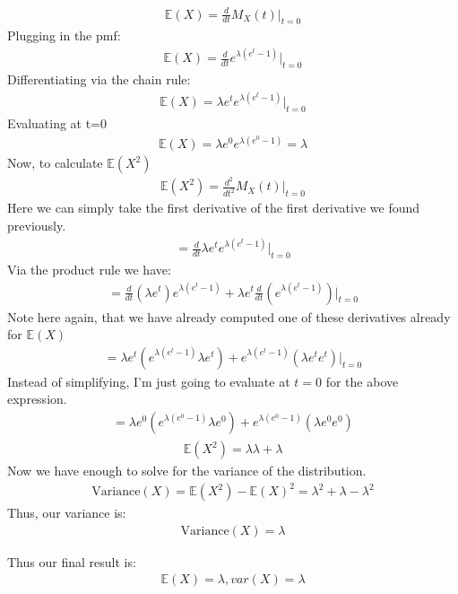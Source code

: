 \documentclass{article}
\begin{document}
\begin{align*}
\mathbb{E}(X)=\frac{d}{dt}M_X(t) |_{t=0}
\end{align*}
Plugging in the pmf:
\begin{align*}
\mathbb{E}(X)=\frac{d}{dt}e^{\lambda(e^t-1)} |_{t=0}
\end{align*}
Differentiating via the chain rule:
\begin{align*}
\mathbb{E}(X)=\lambda e^t e^{\lambda(e^t-1)} |_{t=0}
\end{align*}
Evaluating at t=0
\begin{align*}
\mathbb{E}(X)=\lambda e^0 e^{\lambda(e^0-1)} = \lambda
\end{align*}
Now, to calculate $\mathbb{E}(X^2)$
\begin{align*}
\mathbb{E}(X^2)=\frac{d^2}{dt^2}M_X(t) |_{t=0}
\end{align*}
Here we can simply take the first derivative of the first derivative we found previously.
\begin{align*}
=\frac{d}{dt}\lambda e^t e^{\lambda(e^t-1)} |_{t=0}
\end{align*}
Via the product rule we have:
\begin{align*}
= \frac{d}{dt}(\lambda e^t) e^{\lambda(e^t-1)} + \lambda e^t \frac{d}{dt}(e^{\lambda(e^t-1)}) |_{t=0}
\end{align*}
Note here again, that we have already computed one of these derivatives already for $\mathbb{E}(X)$
\begin{align*}
= \lambda e^t (e^{\lambda(e^t-1)} \lambda e^t) + e^{\lambda(e^t-1)} (\lambda e^t e^t) |_{t=0}
\end{align*}
Instead of simplifying, I'm just going to evaluate at $t=0$ for the above expression.
\begin{align*}
= \lambda e^0 (e^{\lambda(e^0-1)} \lambda e^0) + e^{\lambda(e^0-1)} (\lambda e^0 e^0)
\end{align*}
\begin{align*}
\boxed{\mathbb{E}(X^2)= \lambda \lambda + \lambda }
\end{align*}
Now we have enough to solve for the variance of the distribution.
\begin{align*}
\text{Variance}(X) = \mathbb{E}(X^2)-\mathbb{E}(X)^2 = \lambda^2 + \lambda - \lambda^2
\end{align*}
Thus, our variance is:
\begin{align*}
\text{Variance}(X) = \lambda
\end{align*}

Thus our final result is:
\begin{align*}
\boxed{ \mathbb{E}(X)= \lambda, var(X) = \lambda }
\end{align*}
\end{document}

